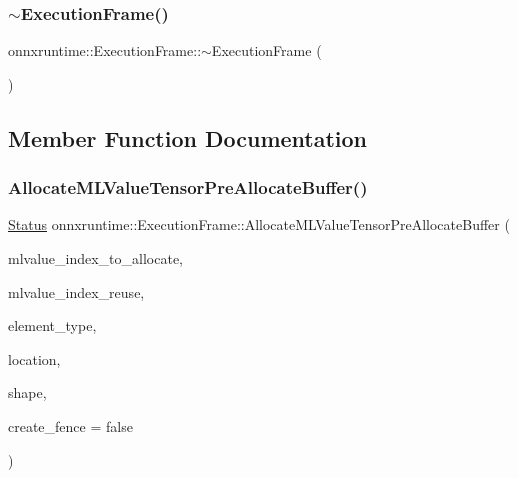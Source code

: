 \mbox{\label{classonnxruntime_1_1ExecutionFrame_ae3466a98440b293795cb6d3bbab14692}} 
\subsubsection{\texorpdfstring{$\sim$\+Execution\+Frame()}{~ExecutionFrame()}}
{\footnotesize\ttfamily onnxruntime\+::\+Execution\+Frame\+::$\sim$\+Execution\+Frame (\begin{DoxyParamCaption}{ }\end{DoxyParamCaption})\hspace{0.3cm}{\ttfamily [default]}}



\subsection{Member Function Documentation}
\mbox{\label{classonnxruntime_1_1ExecutionFrame_ab9258655e4e9c24ccf6db9ba320a668b}} 
\subsubsection{\texorpdfstring{Allocate\+M\+L\+Value\+Tensor\+Pre\+Allocate\+Buffer()}{AllocateMLValueTensorPreAllocateBuffer()}}
{\footnotesize\ttfamily \mbox{\hyperlink{classonnxruntime_1_1common_1_1Status}{Status}} onnxruntime\+::\+Execution\+Frame\+::\+Allocate\+M\+L\+Value\+Tensor\+Pre\+Allocate\+Buffer (\begin{DoxyParamCaption}\item[{int}]{mlvalue\+\_\+index\+\_\+to\+\_\+allocate,  }\item[{int}]{mlvalue\+\_\+index\+\_\+reuse,  }\item[{\mbox{\hyperlink{namespaceonnxruntime_ad77d0a6e838ec7da5dc35fed5ee66b49}{M\+L\+Data\+Type}}}]{element\+\_\+type,  }\item[{const \mbox{\hyperlink{structONNXRuntimeAllocatorInfo}{O\+N\+N\+X\+Runtime\+Allocator\+Info}} \&}]{location,  }\item[{const \mbox{\hyperlink{classonnxruntime_1_1TensorShape}{Tensor\+Shape}} \&}]{shape,  }\item[{bool}]{create\+\_\+fence = {\ttfamily false} }\end{DoxyParamCaption})}

